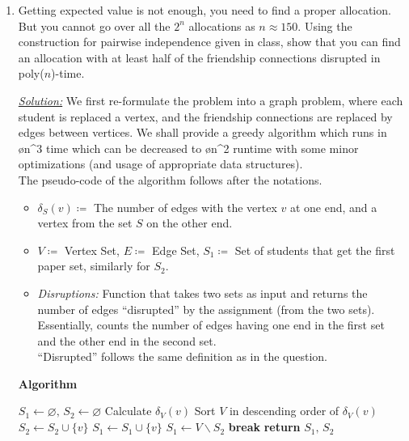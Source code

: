 \documentclass[12pt,titlepage]{report}
\begin{document}
\begin{enumerate}[label=(\alph*)]
    \item Getting expected value is not enough, you need to find a proper allocation. But you cannot go over all the $2^n$ allocations as $n\approx 150$. Using the construction for pairwise independence given in class, show that you can find an allocation with at least half of the friendship connections disrupted in poly($n$)-time.
    \item[\underline{\textit{Solution:}}] We first re-formulate the problem into a graph problem, where each student is replaced a vertex, and the friendship connections are replaced by edges between vertices. We shall provide a greedy algorithm which runs in \o{n^3} time which can be decreased to \o{n^2} runtime with some minor optimizations (and usage of appropriate data structures).\\
    The pseudo-code of the algorithm follows after the notations.
    \begin{itemize}
        \item $\delta_S(v)\coloneqq$ The number of edges with the vertex $v$ at one end, and a vertex from the set $S$ on the other end.
        \item $V\coloneqq$ Vertex Set, $E\coloneqq$ Edge Set, $S_1\coloneqq$ Set of students that get the first paper set, similarly for $S_2$.
        \item \textit{Disruptions:} Function that takes two sets as input and returns the number of edges ``disrupted'' by the assignment (from the two sets). Essentially, counts the number of edges having one end in the first set and the other end in the second set.\\
        ``Disrupted'' follows the same definition as in the question.
    \end{itemize}
    
    \begin{algorithm}
    \caption*{\textbf{Algorithm}}
    \begin{algorithmic}
    \State $S_1 \gets \varnothing,\,S_2\gets\varnothing$
    \State Calculate $\delta_V(v)$
    \EndFor
    \State Sort $V$ in descending order of $\delta_V(v)$
    \State $S_2\gets S_2\cup \{v\}$
    \Else
    \State $S_1\gets S_1\cup\{v\}$
    \EndIf
    \State $S_1\gets V\backslash S_2$
    \State \textbf{break}
    \EndIf
    \EndFor
    \State \textbf{return} $S_1,\,S_2$
    \end{algorithmic}
    \end{algorithm}
\end{enumerate}
\end{document}
